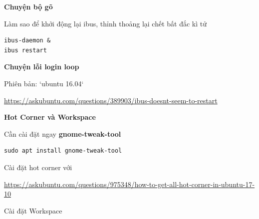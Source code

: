 \textbf{Chuyện bộ gõ}

Làm sao để khởi động lại ibus, thỉnh thoảng lại chết bất đắc kì tử

\begin{lstlisting}
ibus-daemon &
ibus restart
\end{lstlisting}

\textbf{Chuyện lỗi login loop}

Phiên bản: `ubuntu 16.04`



\href{https://askubuntu.com/questions/389903/ibus-doesnt-seem-to-restart}{https://askubuntu.com/questions/389903/ibus-doesnt-seem-to-restart}

\textbf{Hot Corner và Workspace}

Cần cài đặt ngay \textbf{gnome-tweak-tool}

\begin{lstlisting}
sudo apt install gnome-tweak-tool
\end{lstlisting}

Cài đặt hot corner với

\href{https://askubuntu.com/questions/975348/how-to-get-all-hot-corner-in-ubuntu-17-10}{https://askubuntu.com/questions/975348/how-to-get-all-hot-corner-in-ubuntu-17-10}

Cài đặt Workspace